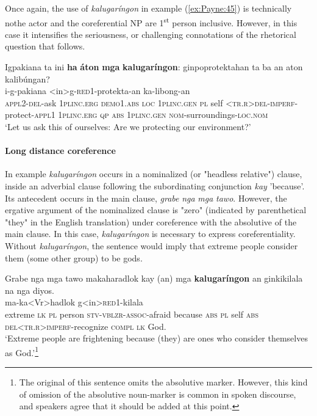 \documentclass[output=paper]{langscibook}
\begin{document}
Once again, the use of \textit{kalugaríngon} in example (\ref{ex:Payne:45}) is technically nothe actor and the coreferential NP are 1\textsuperscript{st} person inclusive. However, in this case it intensifies the seriousness, or challenging connotations of the rhetorical question that follows.

\ea
\label{ex:Payne:45}
\glll
Igpakiana ta ini \textbf{ha} \textbf{áton} \textbf{mga} \textbf{kalugaríngon}: ginpoprotektahan ta ba an aton kalibúngan?\\
i-g-pakiana { } { } { } { } { } { } <in>g-\textsc{red}1-protekta-an { } { } { } { } ka-libong-an\\
\textsc{appl}2-\textsc{del}-ask 1\textsc{plinc.erg} \textsc{demo}1.\textsc{abs} \textsc{loc} 1\textsc{plinc.gen} \textsc{pl} self 
\textsc{<tr.r>del-imperf}{}-protect-\textsc{appl}1 1\textsc{plinc.erg} \textsc{qp} \textsc{abs} 1\textsc{plinc.gen} \textsc{nom}{}-surroundings-\textsc{loc.nom}\\
\glt ‘Let us ask this of ourselves: Are we protecting our environment?'
\z

\paragraph*{Long distance coreference}
In example  \textit{kalugaríngon} occurs in a nominalized (or "headless relative") clause, inside an adverbial clause following the subordinating conjunction \textit{kay} 'because'. Its antecedent occurs in the main clause, \textit{grabe} \textit{nga} \textit{mga} \textit{tawo}. However, the ergative argument of the nominalized clause is "zero" (indicated by parenthetical "they" in the English translation) under coreference with the absolutive of the main clause. In this case, \textit{kalugaríngon} is necessary to express coreferentiality. Without \textit{kalugaríngon}, the sentence would imply that extreme people consider them (some other group) to be gods. 

\ea
\label{ex:Payne:46}
\glll
Grabe nga mga tawo makaharadlok kay (an) mga \textbf{kalugaríngon} an ginkikilala na nga diyos.\\
{ } { } { } { } ma-ka<Vr>hadlok { } { } { } { } { } g<in>\textsc{red}1-kilala { } { } { }\\
extreme \textsc{lk} \textsc{pl} person \textsc{stv-vblzr-assoc}-afraid because \textsc{abs} \textsc{pl} self \textsc{abs} \textsc{del<tr.r>imperf}{}-recognize \textsc{compl} \textsc{lk} God.\\
\glt ‘Extreme people are frightening because (they) are ones who consider themselves as God.'\footnote{The original of this sentence omits the absolutive marker. However, this kind of omission of the absolutive noun-marker is common in spoken discourse, and speakers agree that it should be added at this point.%
} 
\z
\end{document}
